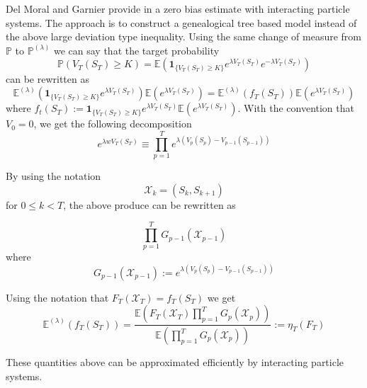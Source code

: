 Del Moral and Garnier provide in \cite{delmoral2005} a zero bias estimate with interacting particle systems. The approach is to construct a genealogical tree based model instead of the above large deviation type inequality.
Using the same change of measure from $\mathbb{P}$ to $\mathbb{P}^{(\lambda)}$ we can say that the target probability
$$\mathbb{P}(V_T(S_T) \geq K) = \mathbb{E}\left( \mathbf{1}_{\{V_T(S_T) \geq K\}}e^{\lambda V_T(S_T)}e^{-\lambda V_T(S_T)} \right)$$
can be rewritten as
$$\mathbb{E}^{(\lambda)} \left(  \mathbf{1}_{\{V_T(S_T) \geq K\}} e^{\lambda V_T(S_T)} \right) \mathbb{E} \left(e^{\lambda V_T(S_T)}\right) = 
\mathbb{E}^{(\lambda)}(f_T(S_T)) \mathbb{E}(e^{\lambda V_T(S_T)})  $$
where $f_t(S_T) := \mathbf{1}_{\{V_T(S_T) \geq K\}}e^{\lambda V_T(S_T)} \mathbb{E}\left(e^{\lambda V_T(S_T)}\right) $. With the convention that $V_0 = 0$, we get the following decomposition
$$e^{\lambda w V_T(S_T)} \equiv \prod_{p=1}^{T} e^{\lambda (V_p(S_p) - V_{p-1}(S_{p-1}))}$$

By using the notation $$\mathcal{X}_k = (S_k, S_{k+1})$$ for $0 \leq k < T$, the above produce can be rewritten as

$$\prod_{p=1}^{T} G_{p-1}(\mathcal{X}_{p-1})$$ where
$$G_{p-1}(\mathcal{X}_{p-1}) := e^{\lambda (V_p(S_p) - V_{p-1}(S_{p-1}))}$$

Using the notation that $F_T(\mathcal{X}_T) = f_T(S_T)$ we get
\begin{equation}
	\mathbb{E}^{(\lambda)}(f_T(S_T)) = \frac{\mathbb{E}(F_T(\mathcal{X}_T)\prod_{p=1}^{T}G_p(\mathcal{X}_p))}{\mathbb{E}(\prod_{p=1}^{T}G_p(\mathcal{X}_p))} := \eta_T(F_T)
\end{equation}

These quantities above can be approximated efficiently by interacting particle systems.

